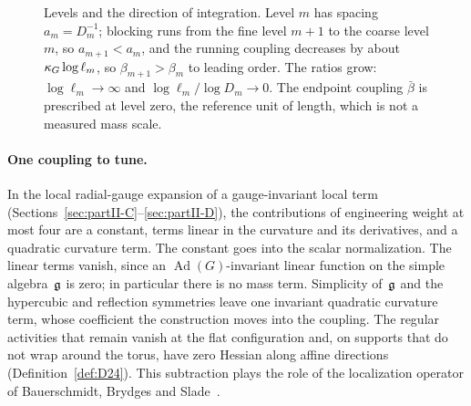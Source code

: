 \begin{figure}[ht]
\centering
{}
\caption{Levels and the direction of integration. Level $m$ has spacing $a_m=D_m^{-1}$; blocking runs from the fine level $m+1$ to the coarse level $m$, so $a_{m+1}<a_m$, and the running coupling decreases by about $\kappa_G\log\ell_m$, so $\beta_{m+1}>\beta_m$ to leading order. The ratios grow: $\log\ell_m\to\infty$ and $\log\ell_m/\log D_m\to0$. The endpoint coupling $\bar\beta$ is prescribed at level zero, the reference unit of length, which is not a measured mass scale.}\label{fig:scales}
\end{figure}



\paragraph{One coupling to tune.}
In the local radial-gauge expansion of a gauge-invariant local term (Sections~\ref{sec:partII-C}--\ref{sec:partII-D}), the contributions of engineering weight at most four are a constant, terms linear in the curvature and its derivatives, and a quadratic curvature term. The constant goes into the scalar normalization. The linear terms vanish, since an $\operatorname{Ad}(G)$-invariant linear function on the simple algebra~$\mathfrak{g}$ is zero; in particular there is no mass term. Simplicity of~$\mathfrak{g}$ and the hypercubic and reflection symmetries leave one invariant quadratic curvature term, whose coefficient the construction moves into the coupling. The regular activities that remain vanish at the flat configuration and, on supports that do not wrap around the torus, have zero Hessian along affine directions (Definition~\ref{def:D24}). This subtraction plays the role of the localization operator of Bauerschmidt, Brydges and Slade~\cite[\S5.2]{BauerschmidtBrydgesSlade2019}.

